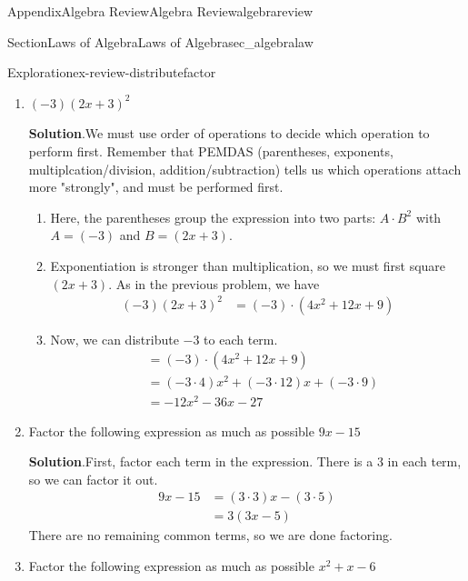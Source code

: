 \documentclass[oneside,10pt,]{tufte-book}
\newcommand{\blocktitlefont}{\relax}
\numberwithin{equation}{chapter}
\newcommand{\amp}{&}
\begin{document}
\begin{appendixptx}{Appendix}{Algebra Review}{}{Algebra Review}{}{}{algebrareview}
\begin{sectionptx}{Section}{Laws of Algebra}{}{Laws of Algebra}{}{}{sec_algebralaw}
\begin{exploration}{Exploration}{}{ex-review-distributefactor}
\begin{enumerate}[font=\bfseries,label=(\alph*),ref=\alph*]
\begin{align*}
(2x+3)^2 \amp = (2x+3)\cdot (2x+3)\\
\amp = (2x\cdot 2x) + (2x\cdot 3) + (3\cdot 2x) + (3\cdot 3)\\
\amp = 4x^2 + 6x + 6x + 9\\
\amp = 4x^2 + 12x + 9
\end{align*}
%
\item{}\((-3)(2x+3)^2\)%
\par\smallskip%
\noindent\textbf{\blocktitlefont Solution}.\hypertarget{ex-review-distributefactor-7-2}{}\quad{}We must use order of operations to decide which operation to perform first.  Remember that PEMDAS (parentheses, exponents, multiplcation\slash{}division, addition\slash{}subtraction) tells us which operations attach more "strongly", and must be performed first.%
\begin{enumerate}
\item{}Here, the parentheses group the expression into two parts: \(A\cdot B^2\) with \(A=(-3)\) and \(B=(2x+3)\).%
\item{}Exponentiation is stronger than multiplication, so we must first square \((2x+3)\).  As in the previous problem, we have%
\begin{align*}
(-3)(2x+3)^2\amp = (-3)\cdot (4x^2 + 12x + 9) 
\end{align*}
%
\item{}Now, we can distribute \(-3\) to each term.%
\begin{align*}
\amp = (-3)\cdot (4x^2 + 12x + 9) \\
\amp = (-3\cdot 4) x^2+ (-3\cdot 12)x + (-3\cdot 9)\\
\amp = -12x^2 - 36x - 27
\end{align*}
%
\end{enumerate}
%
\item{}Factor the following expression as much as possible \(9x - 15\)%
\par\smallskip%
\noindent\textbf{\blocktitlefont Solution}.\hypertarget{ex-review-distributefactor-8-2}{}\quad{}First, factor each term in the expression. There is a 3 in each term, so we can factor it out.%
\begin{align*}
9x - 15 \amp = (3\cdot 3)x - (3\cdot 5) \\
\amp = 3 (3x - 5)
\end{align*}
There are no remaining common terms, so we are done factoring.%
\item{}Factor the following expression as much as possible \(x^2 + x - 6 \)%
\par\smallskip%

\end{enumerate}
\end{exploration}
\end{sectionptx}
\end{appendixptx}
\end{document}
